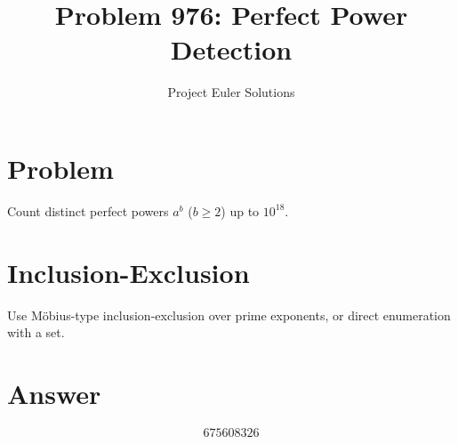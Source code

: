 \documentclass[11pt]{article}
\title{Problem 976: Perfect Power Detection}
\author{Project Euler Solutions}
\date{}
\begin{document}
\maketitle
\section{Problem}
Count distinct perfect powers $a^b$ ($b\ge 2$) up to $10^{18}$.
\section{Inclusion-Exclusion}
Use M\"obius-type inclusion-exclusion over prime exponents, or direct enumeration with a set.
\section{Answer}

\[
\boxed{675608326}
\]
\end{document}
